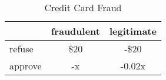 \begin{table}[htbp]
\centering
\begin{tabular}{|l|c|c|}
\hline
                 & \multicolumn{1}{l|}{fraudulent} & \multicolumn{1}{l|}{legitimate} \\ \hline
refuse & \$20                              & -\$20                              \\ \hline
approve & -x                              & -0.02x                              \\ \hline
\end{tabular}
\caption{Credit Card Fraud}
\label{tab:costmatrix_cc_example}
\end{table}
